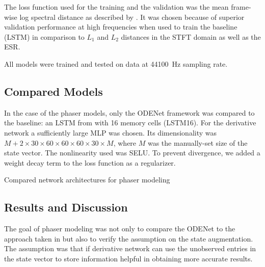 The loss function used for the training and the validation was the mean frame-wise log spectral distance as described by 
.
It was chosen because of superior validation performance at high frequencies when used to train the baseline (\ac{LSTM}) in comparison to $L_1$ and $L_2$ distances in the \ac{STFT} domain as well as the \ac{ESR}.

All models were trained and tested on data at \SI{44100}{Hz} sampling rate.

\subsection{Compared Models}
\label{sec:phaser_models}

In the case of the phaser models, only the ODENet framework was compared to the baseline: an \ac{LSTM} from \cite{Wright2020} with 16 memory cells (\ac{LSTM}16). For the derivative network a sufficiently large \ac{MLP} was chosen. Its dimensionality was $M + 2 \times 30 \times 60 \times 60\times 60 \times 30\times M$, where $M$ was the manually-set size of the state vector. The nonlinearity used was \ac{SELU}. To prevent divergence, we added a weight decay term to the loss function as a regularizer.

\begin{table}[]
    \caption{Compared network architectures for phaser modeling}
    \centering
    
    \label{tab:phaser_models_data}
\end{table}

\subsection{Results and Discussion}
\label{sec:phaser_results}

The goal of phaser modeling was not only to compare the ODENet to the approach taken in \cite{Wright2020} but also to verify the assumption on the state augmentation. The assumption was that if derivative network can use the unobserved entries in the state vector to store information helpful in obtaining more accurate results.

